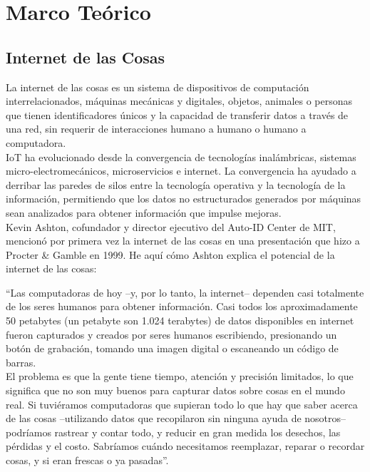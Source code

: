 \chapter{Marco Teórico}

\section{Internet de las Cosas}

La internet de las cosas es un sistema de dispositivos de computación interrelacionados, máquinas mecánicas y digitales, objetos, animales o personas que tienen identificadores únicos y la capacidad de transferir datos a través de una red, sin requerir de interacciones humano a humano o humano a computadora. \\

IoT ha evolucionado desde la convergencia de tecnologías inalámbricas, sistemas micro-electromecánicos, microservicios e internet. La convergencia ha ayudado a derribar las paredes de silos entre la tecnología operativa  y la tecnología de la información, permitiendo que los datos no estructurados generados por máquinas sean analizados para obtener información que impulse mejoras. \cite{TechT2017}\\

Kevin Ashton, cofundador y director ejecutivo del Auto-ID Center de MIT, mencionó por primera vez la internet de las cosas en una presentación que hizo a Procter \& Gamble en 1999. He aquí cómo Ashton explica el potencial de la internet de las cosas:

``Las computadoras de hoy –y, por lo tanto, la internet– dependen casi totalmente de los seres humanos para obtener información. Casi todos los aproximadamente 50 petabytes (un petabyte son 1.024 terabytes) de datos disponibles en internet fueron capturados y creados por seres humanos escribiendo, presionando un botón de grabación, tomando una imagen digital o escaneando un código de barras. \\

El problema es que la gente tiene tiempo, atención y precisión limitados, lo que significa que no son muy buenos para capturar datos sobre cosas en el mundo real. Si tuviéramos computadoras que supieran todo lo que hay que saber acerca de las cosas –utilizando datos que recopilaron sin ninguna ayuda de nosotros– podríamos rastrear y contar todo, y reducir en gran medida los desechos, las pérdidas y el costo. Sabríamos cuándo necesitamos reemplazar, reparar o recordar cosas, y si eran frescas o ya pasadas”. \cite{Asthon2009}

